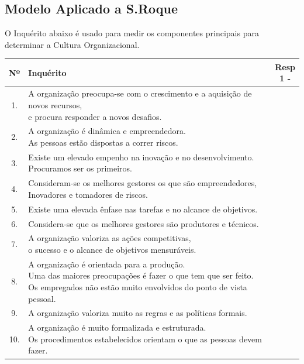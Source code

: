 {\newpage
\subsection{Modelo Aplicado a S.Roque}
O Inquérito abaixo é usado para medir os componentes principais para determinar a Cultura Organizacional.
\begin{table}[h!]
\begin{adjustbox}{max width=\textwidth}
\begin{tabular}{ |c|l|c| }
\hline
\rowcolor[gray]{0.5}
Nº & Inquérito & \makecell[l]{Resp \\ 1 \; - \; 7} \\
\hline
1. & \makecell[l]{A organização preocupa-se com o crescimento e a aquisição de novos recursos, \\ e procura responder a novos desafios.} & \\
\hline
2. & \makecell[l]{A organização é dinâmica e empreendedora. \\ As pessoas estão dispostas a correr riscos.} & \\
\hline
3. & \makecell[l]{Existe um elevado empenho na inovação e no desenvolvimento. \\ Procuramos ser os primeiros.} & \\
\hline
4. & \makecell[l]{Consideram-se os melhores gestores os que são empreendedores, \\ Inovadores e tomadores de riscos.} & \\
\hline
5. & Existe uma elevada ênfase nas tarefas e no alcance de objetivos. & \\
\hline
6. & Considera-se que os melhores gestores são produtores e técnicos. & \\
\hline
7. & \makecell[l]{A organização valoriza as ações competitivas, \\ o sucesso e o alcance de objetivos mensuráveis.} & \\
\hline
8. & \makecell[l]{A organização é orientada para a produção. \\ Uma das maiores preocupações é fazer o que tem que ser feito. \\ Os empregados não estão muito envolvidos do ponto de vista pessoal.} & \\
\hline
9. & A organização valoriza muito as regras e as políticas formais. & \\
\hline
10. & \makecell[l]{A organização é muito formalizada e estruturada. \\ Os procedimentos estabelecidos orientam o que as pessoas devem fazer.} & \\

\end{tabular}
\end{adjustbox}
\end{table}}
